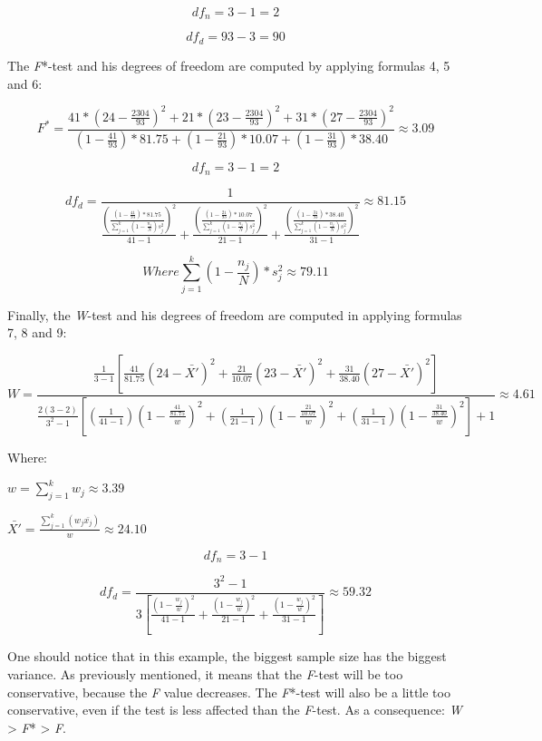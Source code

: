 \begin{appendix}
\[
df_n=3-1=2
\]

\[
df_d=93-3=90
\]

The \emph{F}*-test and his degrees of freedom are computed by applying
formulas 4, 5 and 6:

\[
F^*=\frac{41*(24-\frac{2304}{93})^2+21*(23-\frac{2304}{93})^2+31*(27-\frac{2304}{93})^2}{(1-\frac{41}{93})*81.75+(1-\frac{21}{93})*10.07+(1-\frac{31}{93})*38.40} \approx 3.09
\]

\[
df_n=3-1=2
\]

\[
df_d=\frac{1}{\frac{(\frac{(1-\frac{41}{93})*81.75}{\sum_{j=1}^k(1-\frac{n_j}{N})s_j^2})^2}{41-1}+\frac{(\frac{(1-\frac{21}{93})*10.07}{\sum_{j=1}^k(1-\frac{n_j}{N})s_j^2})^2}{21-1}+\frac{(\frac{(1-\frac{31}{93})*38.40}{\sum_{j=1}^k(1-\frac{n_j}{N})s_j^2})^2}{31-1}} \approx 81.15
\]

\[ Where \sum_{j=1}^k(1-\frac{n_j}{N})*s_j^2 \approx 79.11\]

Finally, the \emph{W}-test and his degrees of freedom are computed in
applying formulas 7, 8 and 9:

\[
W=\frac{\frac{1}{3-1}[\frac{41}{81.75}(24-\bar{X'})^2+\frac{21}{10.07}(23-\bar{X'})^2+\frac{31}{38.40}(27-\bar{X'})^2]}
{\frac{2(3-2)}{3^2-1}[(\frac{1}{41-1})(1-\frac{\frac{41}{81.75}}{w})^2+(\frac{1}{21-1})(1-\frac{\frac{21}{10.07}}{w})^2+(\frac{1}{31-1})(1-\frac{\frac{31}{38.40}}{w})^2]+1} \approx 4.61
\]

Where:

\(w=\sum_{j=1}^k w_j \approx 3.39\)

\(\bar{X'}=\frac{\sum_{j=1}^k (w_j\bar{x_j})}{w} \approx 24.10\)

\[
df_n=3-1
\]

\[
df_d=\frac{3^2-1}{3[\frac{(1-\frac{w_j}{w})^2}{41-1}+\frac{(1-\frac{w_j}{w})^2}{21-1}+\frac{(1-\frac{w_j}{w})^2}{31-1}]} \approx 59.32
\]

One should notice that in this example, the biggest sample size has the
biggest variance. As previously mentioned, it means that the
\emph{F}-test will be too conservative, because the \emph{F} value
decreases. The \emph{F}*-test will also be a little too conservative,
even if the test is less affected than the \emph{F}-test. As a
consequence: \emph{W} \textgreater{} \emph{F}* \textgreater{} \emph{F}.
\end{appendix}
